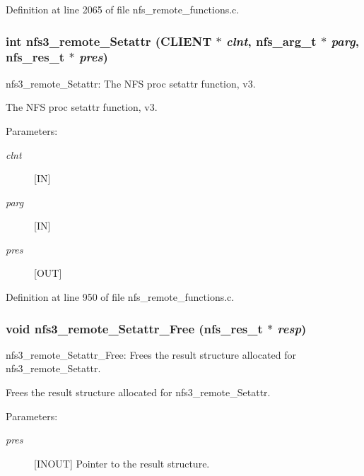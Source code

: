 Definition at line 2065 of file nfs\_\-remote\_\-functions.c.
\subsubsection[{nfs3\_\-remote\_\-Setattr}]{\setlength{\rightskip}{0pt plus 5cm}int nfs3\_\-remote\_\-Setattr (CLIENT $\ast$ {\em clnt}, \/  nfs\_\-arg\_\-t $\ast$ {\em parg}, \/  nfs\_\-res\_\-t $\ast$ {\em pres})}\label{group__NFSprocs_g42b9b2df48ae1e7dd577ce846fb3e9e9}


nfs3\_\-remote\_\-Setattr: The NFS proc setattr function, v3.

The NFS proc setattr function, v3.

\begin{Desc}
\item[Parameters:]
\begin{description}
\item[{\em clnt}][IN] \item[{\em parg}][IN] \item[{\em pres}][OUT] \end{description}
\end{Desc}


Definition at line 950 of file nfs\_\-remote\_\-functions.c.
\subsubsection[{nfs3\_\-remote\_\-Setattr\_\-Free}]{\setlength{\rightskip}{0pt plus 5cm}void nfs3\_\-remote\_\-Setattr\_\-Free (nfs\_\-res\_\-t $\ast$ {\em resp})}\label{group__NFSprocs_g8ac3d130ecc9a7b8a54052269c90f950}


nfs3\_\-remote\_\-Setattr\_\-Free: Frees the result structure allocated for nfs3\_\-remote\_\-Setattr.

Frees the result structure allocated for nfs3\_\-remote\_\-Setattr.

\begin{Desc}
\item[Parameters:]
\begin{description}
\item[{\em pres}][INOUT] Pointer to the result structure. \end{description}
\end{Desc}


